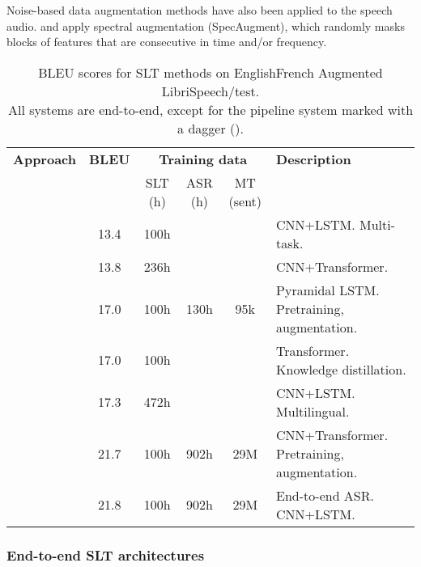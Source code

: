 \documentclass{svjour3}
\newcommand{\lp}[2]{#1#2}
\newcommand{\uua}[0]{}
\newcommand{\dg}[0] {}
\begin{document}
Noise-based data augmentation methods have also been applied to the speech audio.
\citet{bahar2019usingSpecAugment} and \citet{digangi2019data} apply spectral augmentation (SpecAugment),
which randomly masks blocks of features that are consecutive in time and/or frequency.

\begin{table}[t]
\centering
\caption{BLEU scores for SLT methods on \lp{English}{French} Augmented LibriSpeech/test.\\
All systems are end-to-end,
except for the pipeline system marked with a dagger (\dg).
\label{tbl:slt:librispeech}}
\renewcommand{\arraystretch}{1.1}
\begin{tabular}{@{}lccccl@{}}
\toprule
\textbf{Approach}                  & \textbf{BLEU \uua} & \multicolumn{3}{c}{\textbf{Training data}} & \textbf{Description} \\ 
\cmidrule(lr){3-5}
                                   &                    & SLT (h) & ASR (h) & MT (sent) & \\
\midrule
\citet{berard-e2e-audiobooks-2018} & 13.4               & 100h    &         &           & CNN+LSTM. Multi-task. \\
\citet{di2019adapting}             & 13.8               & 236h    &         &           & CNN+Transformer. \\
\citet{bahar2019usingSpecAugment}  & 17.0               & 100h    & 130h    & 95k       & Pyramidal LSTM. Pretraining, augmentation. \\
\citet{liu2019end}                 & 17.0               & 100h    &         &           & Transformer. Knowledge distillation. \\
\citet{inaguma2019multilingual}    & 17.3               & 472h    &         &           & CNN+LSTM. Multilingual. \\
\citet{pino2019harnessing}         & 21.7               & 100h    & 902h    & 29M       & CNN+Transformer. Pretraining, augmentation. \\
\citet{pino2019harnessing}\dg      & 21.8               & 100h    & 902h    & 29M       & End-to-end ASR. CNN+LSTM. \\
\bottomrule
\end{tabular}
\end{table}

\subsubsection{End-to-end SLT architectures}
\end{document}
